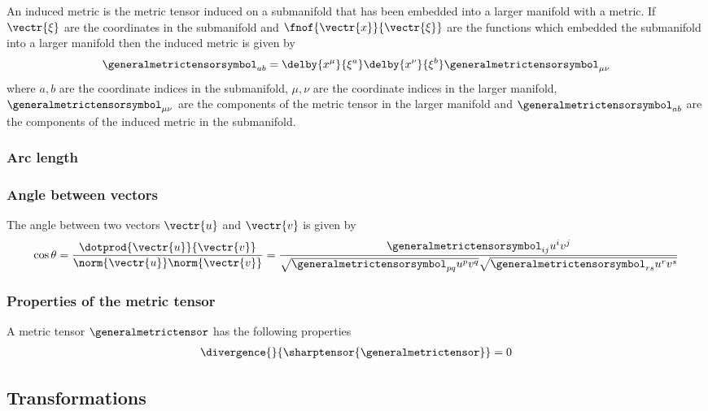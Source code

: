 An induced metric is the metric tensor induced on a submanifold that has been
embedded into a larger manifold with a metric. If $\vectr{\xi}$ are the
coordinates in the submanifold and $\fnof{\vectr{x}}{\vectr{\xi}}$ are the
functions which embedded the submanifold into a larger manifold then the
induced metric is given by
\begin{equation}
  \generalmetrictensorsymbol_{ab}=\delby{x^{\mu}}{\xi^{a}}\delby{x^{\nu}}{\xi^{b}}\generalmetrictensorsymbol_{\mu\nu}
\end{equation}
where $a, b$ are the coordinate indices in the submanifold, $\mu, \nu$ are the
coordinate indices in the larger manifold, $\generalmetrictensorsymbol_{\mu\nu}$ are the components of
the metric tensor in the larger manifold and $\generalmetrictensorsymbol_{ab}$ are the components of
the induced metric in the submanifold.

\subsubsection{Arc length}

\subsubsection{Angle between vectors}

The angle between two vectors $\vectr{u}$ and $\vectr{v}$ is given by
\begin{equation}
  \cos\theta=\dfrac{\dotprod{\vectr{u}}{\vectr{v}}}{\norm{\vectr{u}}\norm{\vectr{v}}}=
  \dfrac{\generalmetrictensorsymbol_{ij}u^{i}v^{j}}{\sqrt{\generalmetrictensorsymbol_{pq}u^{p}v^{q}}\sqrt{\generalmetrictensorsymbol_{rs}u^{r}v^{s}}}
  \label{eqn:AngleBetweenVectors}
\end{equation}

\subsubsection{Properties of the metric tensor}

A metric tensor $\generalmetrictensor$ has the following properties
\begin{align}
  \divergence{}{\sharptensor{\generalmetrictensor}}=0
  \label{eqn:DivergenceSharpMetricTensor}
\end{align}

\subsection{Transformations}

